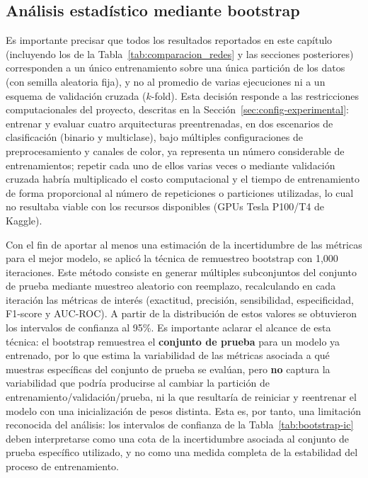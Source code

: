 \subsection{Análisis estadístico mediante bootstrap}

Es importante precisar que todos los resultados reportados en este capítulo (incluyendo
los de la Tabla~\ref{tab:comparacion_redes} y las secciones posteriores) corresponden a
un único entrenamiento sobre una única partición de los datos (con semilla aleatoria
fija), y no al promedio de varias ejecuciones ni a un esquema de validación cruzada
($k$-fold). Esta decisión responde a las restricciones computacionales del proyecto,
descritas en la Sección~\ref{sec:config-experimental}: entrenar y evaluar cuatro
arquitecturas preentrenadas, en dos escenarios de clasificación (binario y multiclase),
bajo múltiples configuraciones de preprocesamiento y canales de color, ya representa un
número considerable de entrenamientos; repetir cada uno de ellos varias veces o mediante
validación cruzada habría multiplicado el costo computacional y el tiempo de
entrenamiento de forma proporcional al número de repeticiones o particiones utilizadas,
lo cual no resultaba viable con los recursos disponibles (GPUs Tesla P100/T4 de Kaggle).

Con el fin de aportar al menos una estimación de la incertidumbre de las métricas para el
mejor modelo, se aplicó la técnica de remuestreo bootstrap con 1,000 iteraciones. Este
método consiste en generar múltiples subconjuntos del conjunto de prueba mediante
muestreo aleatorio con reemplazo, recalculando en cada iteración las métricas de interés
(exactitud, precisión, sensibilidad, especificidad, F1-score y AUC-ROC). A partir de la
distribución de estos valores se obtuvieron los intervalos de confianza al 95\%. Es
importante aclarar el alcance de esta técnica: el bootstrap remuestrea el
\textbf{conjunto de prueba} para un modelo ya entrenado, por lo que estima la
variabilidad de las métricas asociada a qué muestras específicas del conjunto de prueba
se evalúan, pero \textbf{no} captura la variabilidad que podría producirse al cambiar la
partición de entrenamiento/validación/prueba, ni la que resultaría de reiniciar y
reentrenar el modelo con una inicialización de pesos distinta. Esta es, por tanto, una
limitación reconocida del análisis: los intervalos de confianza de la
Tabla~\ref{tab:bootstrap-ic} deben interpretarse como una cota de la incertidumbre
asociada al conjunto de prueba específico utilizado, y no como una medida completa de la
estabilidad del proceso de entrenamiento.

